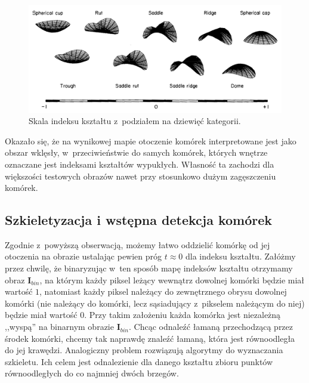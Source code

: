 \documentclass[declaration,shortabstract,mgr]{iithesis}
\newcommand{\image}{\mathbf{I}}
\begin{document}
\begin{figure}
  \includegraphics[width=\textwidth]{images/shape-index-range.png}
  \caption{Skala indeksu kształtu z~podziałem na dziewięć kategorii. \cite{paper:shape-index}}
  \label{fig:shape-index-range}
\end{figure}

Okazało się, że na wynikowej mapie otoczenie komórek interpretowane jest jako obszar wklęsły, w~przeciwieństwie do samych komórek, których wnętrze oznaczane jest indeksami kształtów wypukłych.
Własność ta zachodzi dla większości testowych obrazów nawet przy stosunkowo dużym zagęszczeniu komórek.

\subsection{Szkieletyzacja i wstępna detekcja komórek}

Zgodnie z~powyższą obserwacją, możemy łatwo oddzielić komórkę od jej otoczenia na obrazie ustalając pewien próg $t \approx 0$ dla indeksu kształtu.
Załóżmy przez chwilę, że binaryzując w~ten sposób mapę indeksów kształtu otrzymamy obraz $\image_{bin}$, na którym każdy piksel leżący wewnątrz dowolnej komórki będzie miał wartość $1$, natomiast każdy piksel należący do zewnętrznego obrysu dowolnej komórki (nie należący do komórki, lecz sąsiadujący z~pikselem należącym do niej) będzie miał wartość $0$.
Przy takim założeniu każda komórka jest niezależną ,,wyspą'' na binarnym obrazie $\image_{bin}$.
Chcąc odnaleźć łamaną przechodzącą przez środek komórki, chcemy tak naprawdę znaleźć łamaną, która jest równoodległa do jej krawędzi.
Analogiczny problem rozwiązują algorytmy do wyznaczania szkieletu.
Ich celem jest odnalezienie dla danego kształtu zbioru punktów równoodległych do co najmniej dwóch brzegów.
\end{document}
